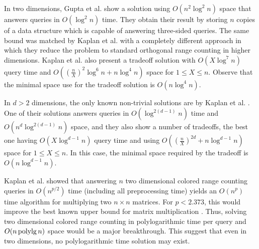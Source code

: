 In two dimensions, Gupta et al. \cite{gupta1995further} show a solution using $O(n^2 \log^2 n)$ space that answers queries in $O(\log^2 n)$ time. They obtain their result by storing $n$ copies of a data structure which is capable of answering three-sided queries. The same bound was matched by Kaplan et al. \cite{kaplan2007counting} with a completely different approach in which they reduce the problem to standard orthogonal range counting in higher dimensions. Kaplan et al. also present a tradeoff solution with $O(X \log^7 n)$ query time and $O((\frac{n}{X})^2 \log^6 n + n \log^4 n)$ space for $1 \leq X \leq n$. Observe that the minimal space use for the tradeoff solution is $O(n \log^4 n)$.

In $d > 2$ dimensions, the only known non-trivial solutions are by Kaplan et al. \cite{kaplan2007counting}. One of their solutions answers queries in $O(\log ^{2(d-1)} n)$ time and $O(n^d \log ^{2(d-1)} n)$ space, and they also show a number of tradeoffs, the best one having $O(X \log^{d-1} n)$ query time and using $O((\frac{n}{X})^{2d} + n \log^{d-1} n)$ space for $1 \leq X \leq n$. In this case, the minimal space required by the tradeoff is $O(n \log ^{d-1} n)$.

Kaplan et al. \cite{kaplan2007counting} showed that answering $n$ two dimensional colored range counting queries in $O(n^{p/2})$ time (including all preprocessing time) yields an $O(n^p)$ time algorithm for multiplying two $n \times n$ matrices. For $p < 2.373$, this would improve the best known upper bound for matrix multiplication \cite{williams2012multiplying}. Thus, solving two dimensional colored range counting in polylogarithmic time per query and $O(n \mathrm{\, polylg \,} n)$ space would be a major breakthrough. This suggest that even in two dimensions, no polylogarithmic time solution may exist.



